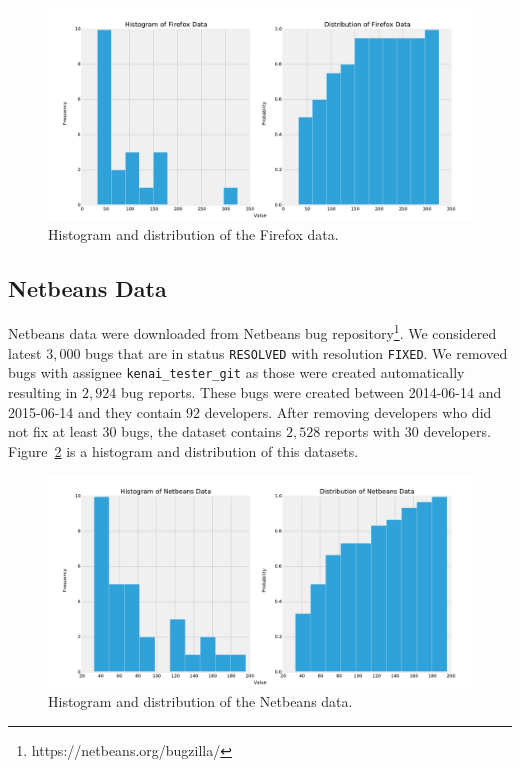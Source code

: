 \begin{figure}[htbp]
    \centering
        \includegraphics[width=\textwidth]{./images/distribution/firefox.pdf}
    \caption{Histogram and distribution of the Firefox data.}
    \label{fig:datasets.firefox.dist}
\end{figure}

\subsection{Netbeans Data}

Netbeans data were downloaded from Netbeans bug repository\footnote{https://netbeans.org/bugzilla/}. We considered latest $3,000$ bugs that are in status \texttt{RESOLVED} with resolution \texttt{FIXED}. We removed bugs with assignee \texttt{kenai\_tester\_git} as those were created automatically resulting in $2,924$ bug reports. These bugs were created between 2014-06-14 and 2015-06-14 and they contain $92$ developers. After removing developers who did not fix at least 30 bugs, the dataset contains $2,528$ reports with $30$ developers. Figure~\ref{fig:datasets.netbeans.dist} is a histogram and distribution of this datasets.

\begin{figure}[htbp]
    \centering
        \includegraphics[width=\textwidth]{./images/distribution/netbeans.pdf}
    \caption{Histogram and distribution of the Netbeans data.}
    \label{fig:datasets.netbeans.dist}
\end{figure}

